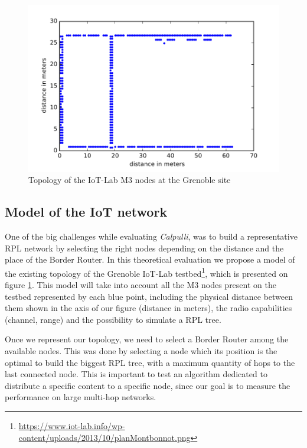 \begin{figure}[htb]
	\centering
	\includegraphics[width=0.8 \columnwidth]{chapters/calpulli.images/grenoble-topology-m3.pdf}
	\caption{Topology of the IoT-Lab M3 nodes at the Grenoble site} \label{fig:GrenobleTopology}
\end{figure}

\subsection{Model of the IoT network}
One of the big challenges while evaluating \textit{Calpulli}, was to build a representative RPL network by selecting the right nodes depending on the distance and the place of the Border Router.
In this theoretical evaluation we propose a model of the existing topology of the Grenoble IoT-Lab testbed\footnote{\url{https://www.iot-lab.info/wp-content/uploads/2013/10/planMontbonnot.png}}, which is presented on figure \ref{fig:GrenobleTopology}.
This model will take into account all the M3 nodes present on the testbed represented by each blue point, including the physical distance between them shown in the axis of our figure (distance in meters), the radio capabilities (channel, range) and the possibility to simulate a RPL tree.

Once we represent our topology, we need to select a Border Router among the available nodes.
This was done by selecting a node which its position is the optimal to build the biggest RPL tree, with a maximum quantity of hops to the last connected node.
This is important to test an algorithm dedicated to distribute a specific content to a specific node, since our goal is to measure the performance on large multi-hop networks.

